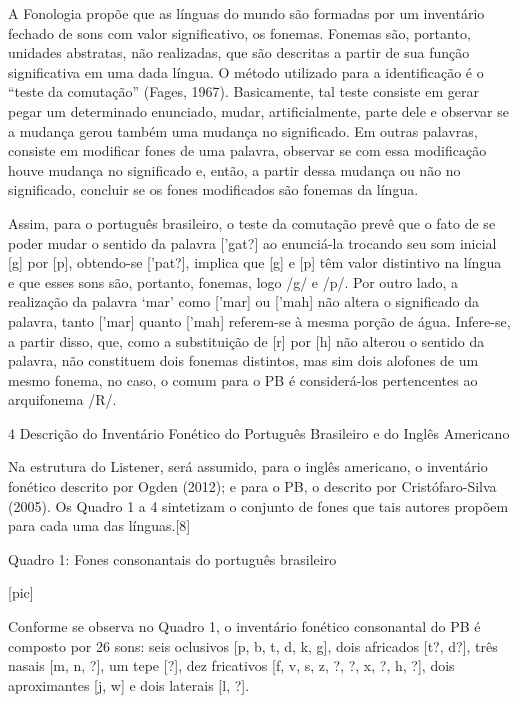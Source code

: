 A Fonologia prop\~oe que as l\'inguas do mundo s\~ao formadas por um
invent\'ario fechado de sons com valor significativo, os fonemas. Fonemas
s\~ao, portanto, unidades abstratas, n\~ao realizadas, que s\~ao descritas a
partir de sua fun\c{c}\~ao significativa em uma dada l\'ingua. O m\'etodo
utilizado para a identifica\c{c}\~ao \'e o ``teste da comuta\c{c}\~ao'' (Fages, 1967).
Basicamente, tal teste consiste em gerar pegar um determinado enunciado,
mudar, artificialmente, parte dele e observar se a mudan\c{c}a gerou tamb\'em
uma mudan\c{c}a no significado. Em outras palavras, consiste em modificar
fones de uma palavra, observar se com essa modifica\c{c}\~ao houve mudan\c{c}a no
significado e, ent\~ao, a partir dessa mudan\c{c}a ou n\~ao no significado,
concluir se os fones modificados s\~ao fonemas da l\'ingua.

Assim, para o portugu\^es brasileiro, o teste da comuta\c{c}\~ao prev\^e que o
fato de se poder mudar o sentido da palavra {[}'gat?{]} ao enunci\'a-la
trocando seu som inicial {[}g{]} por {[}p{]}, obtendo-se {[}'pat?{]},
implica que {[}g{]} e {[}p{]} t\^em valor distintivo na l\'ingua e que esses
sons s\~ao, portanto, fonemas, logo /g/ e /p/. Por outro lado, a
realiza\c{c}\~ao da palavra `mar' como {[}'mar{]} ou {[}'mah{]} n\~ao altera o
significado da palavra, tanto {[}'mar{]} quanto {[}'mah{]} referem-se à
mesma por\c{c}\~ao de \'agua. Infere-se, a partir disso, que, como a
substitui\c{c}\~ao de {[}r{]} por {[}h{]} n\~ao alterou o sentido da palavra,
n\~ao constituem dois fonemas distintos, mas sim dois alofones de um mesmo
fonema, no caso, o comum para o PB \'e consider\'a-los pertencentes ao
arquifonema /R/.

4 Descri\c{c}\~ao do Invent\'ario Fon\'etico do Portugu\^es Brasileiro e do Ingl\^es
Americano

Na estrutura do Listener, ser\'a assumido, para o ingl\^es americano, o
invent\'ario fon\'etico descrito por Ogden (2012); e para o PB, o descrito
por Crist\'ofaro-Silva (2005). Os Quadro 1 a 4 sintetizam o conjunto de
fones que tais autores prop\~oem para cada uma das l\'inguas.{[}8{]}

        Quadro 1: Fones consonantais do portugu\^es brasileiro

                                [pic]

Conforme se observa no Quadro 1, o invent\'ario fon\'etico consonantal do PB
\'e composto por 26 sons: seis oclusivos {[}p, b, t, d, k, g{]}, dois
africados {[}t?, d?{]}, tr\^es nasais {[}m, n, ?{]}, um tepe {[}?{]}, dez
fricativos {[}f, v, s, z, ?, ?, x, ?, h, ?{]}, dois aproximantes {[}j,
w{]} e dois laterais {[}l, ?{]}.

